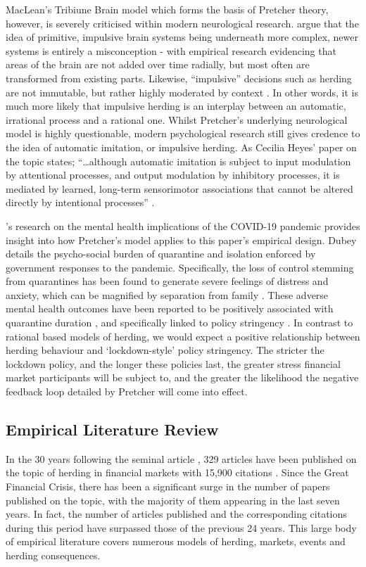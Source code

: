 \documentclass[12pt]{article}
\numberwithin{table}{section}   %
\begin{document}
MacLean’s Tribiune Brain model which forms the basis of Pretcher theory, however, is severely criticised within modern neurological research. \citet{cesario} argue that the idea of primitive, impulsive brain systems being underneath more complex, newer systems is entirely a misconception - with empirical research evidencing that areas of the brain are not added over time radially, but most often are transformed from existing parts. Likewise, “impulsive” decisions such as herding are not immutable, but rather highly moderated by context \citep{kidd, gawronski}. In other words, it is much more likely that impulsive herding is an interplay between an automatic, irrational process and a rational one. Whilst Pretcher’s underlying neurological model is highly questionable, modern psychological research still gives credence to the idea of automatic imitation, or impulsive herding. As Cecilia Heyes’ paper on the topic states; “…although automatic imitation is subject to input modulation by attentional processes, and output modulation by inhibitory processes, it is mediated by learned, long-term sensorimotor associations that cannot be altered directly by intentional processes” \citep{heyes}.

\citet{dubey}’s research on the mental health implications of the COVID-19 pandemic provides insight into how Pretcher's model applies to this paper’s empirical design. Dubey details the psycho-social burden of quarantine and isolation enforced by government responses to the pandemic. Specifically, the loss of control stemming from quarantines has been found to generate severe feelings of distress and anxiety, which can be magnified by separation from family \citep{brooks}. These adverse mental health outcomes have been reported to be positively associated with quarantine duration \citep{hawryluck}, and specifically linked to policy stringency \citep{aknin}. In contrast to rational based models of herding, we would expect a positive relationship between herding behaviour and ‘lockdown-style’ policy stringency. The stricter the lockdown policy, and the longer these policies last, the greater stress financial market participants will be subject to, and the greater the likelihood the negative feedback loop detailed by Pretcher will come into effect.

\subsection{Empirical Literature Review}

In the 30 years following the seminal article \citet{scharfstein}, 329 articles have been published on the topic of herding in financial markets with 15,900 citations \citep{choijil}. Since the Great Financial Crisis, there has been a significant surge in the number of papers published on the topic, with the majority of them appearing in the last seven years. In fact, the number of articles published and the corresponding citations during this period have surpassed those of the previous 24 years. This large body of empirical literature covers numerous models of herding, markets, events and herding consequences.
\end{document}
